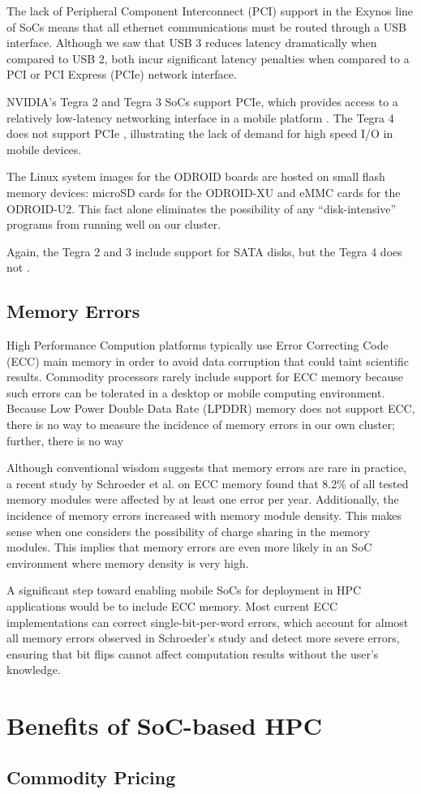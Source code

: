 \documentclass[11pt]{book}
\begin{document}
The lack of Peripheral Component Interconnect (PCI) support in the Exynos line
of SoCs means that all ethernet communications must be routed through a USB
interface. Although we saw that USB 3 reduces latency dramatically when compared
to USB 2, both incur significant latency penalties when compared to a PCI or PCI
Express (PCIe) network interface.

NVIDIA's Tegra 2 and Tegra 3 SoCs support PCIe, which provides access to a
relatively low-latency networking interface in a mobile platform
\cite{rajovic-13}. The Tegra 4 does not support PCIe \cite{arstch-tegra},
illustrating the lack of demand for high speed I/O in mobile devices.

The Linux system images for the ODROID boards are hosted on small flash memory
devices: microSD cards for the ODROID-XU and eMMC cards for the ODROID-U2. This
fact alone eliminates the possibility of any ``disk-intensive'' programs from
running well on our cluster.

Again, the Tegra 2 and 3 include support for SATA disks, but the Tegra 4 does
not \cite{arstch-tegra}.

\subsection{\textbf{Memory Errors}}

High Performance Compution platforms typically use Error Correcting Code (ECC)
main memory in order to avoid data corruption that could taint scientific
results. Commodity processors rarely include support for ECC memory because such
errors can be tolerated in a desktop or mobile computing environment. Because
Low Power Double Data Rate (LPDDR) memory does not support ECC, there is no way
to measure the incidence of memory errors in our own cluster; further, there is
no way

Although conventional wisdom suggests that memory errors are rare in practice, a
recent study by Schroeder et al. \cite{schroeder-09} on ECC memory found that
8.2\% of all tested memory modules were affected by at least one error per
year. Additionally, the incidence of memory errors increased with memory module
density. This makes sense when one considers the possibility of charge sharing
in the memory modules. This implies that memory errors are even more likely in
an SoC environment where memory density is very high.

A significant step toward enabling mobile SoCs for deployment in HPC
applications would be to include ECC memory. Most current ECC implementations
can correct single-bit-per-word errors, which account for almost all memory
errors observed in Schroeder's study \cite{schroeder-09} and detect more severe
errors, ensuring that bit flips cannot affect computation results without the
user's knowledge.

\section{\textbf{Benefits of SoC-based HPC}}

\subsection{\textbf{Commodity Pricing}}

\newpage
 
\end{document}
